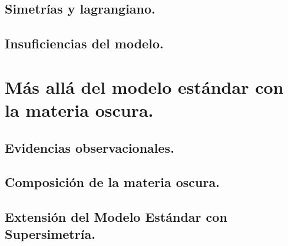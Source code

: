 \documentclass[12pt]{report}
\begin{document}
		\subsection{Simetrías y lagrangiano.} 
		
	
		\subsection{Insuficiencias del modelo.}
		
	
	
	\section{M\'as all\'a del modelo est\'andar con la materia oscura.}
	
	
		\subsection{Evidencias observacionales.}
		
		
		
		\subsection{Composición de la materia oscura.}
		
		
		
		
		\subsection{Extensión del Modelo Estándar con Supersimetría.}
		
\end{document}
